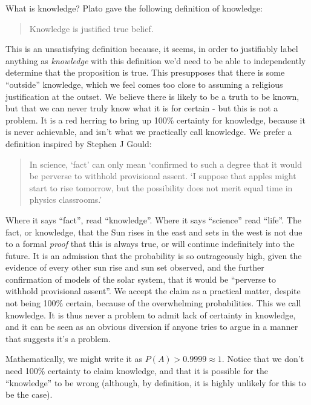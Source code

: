 What is knowledge?  Plato gave the following definition of knowledge:

\begin{quote}
Knowledge is justified true belief.\cite{fine2003plato}
\end{quote}

This is an unsatisfying definition because, it seems, in
order to justifiably label anything as \emph{knowledge} with this
definition we'd need to be able to independently determine that the
proposition is true. This presupposes that there is some ``outside''
knowledge, which we feel comes too close to assuming a religious
justification at the outset.  We believe there is likely to be a truth to be known, but that we can never truly know what it is for certain - but this is not a problem. It is a red herring to bring up 100\% certainty for knowledge, because it is never achievable, and isn't what we practically call knowledge. We prefer a definition inspired by Stephen J Gould:

\begin{quote}
In science, `fact' can only mean `confirmed to such a degree that it
would be perverse to withhold provisional assent. `I suppose that apples
might start to rise tomorrow, but the possibility does not merit equal
time in physics classrooms.'\cite{gould1981evolution}
\end{quote}

Where it says ``fact'', read ``knowledge''.  Where it says ``science''
read ``life''.  The fact, or knowledge, that the Sun rises in the east and sets in 
the west is not due to a formal \emph{proof} that this is always true, or will 
continue indefinitely into the future.  It is an admission that the probability is so 
outrageously high, given the evidence of every other sun rise and sun set observed, 
and the further confirmation of models of the solar system, that it would be ``perverse to withhold provisional assent''.  We accept the claim as a practical matter, despite not being 100\% certain, because of the overwhelming probabilities.  This we call knowledge.  It is thus never a problem to admit lack of certainty in knowledge, and it can be seen as an obvious diversion if anyone tries to argue in a manner that suggests it's a problem.

Mathematically, we might write it as $P(A)>0.9999 \approx 1$.  Notice that we don't need 100\% certainty to claim knowledge, and that it is possible for the ``knowledge'' to be wrong (although, by definition, it is highly unlikely for this to be the case).  


